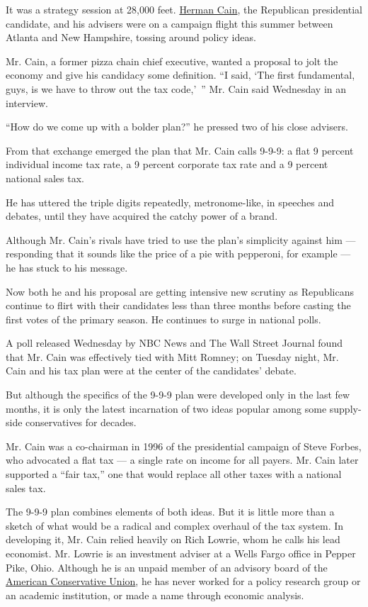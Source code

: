 It was a strategy session at 28,000 feet.
\href{http://elections.nytimes.com/2012/primaries/candidates/herman-cain}{Herman
Cain}, the Republican presidential candidate, and his advisers were on a
campaign flight this summer between Atlanta and New Hampshire, tossing
around policy ideas.

Mr. Cain, a former pizza chain chief executive, wanted a proposal to
jolt the economy and give his candidacy some definition. ``I said, `The
first fundamental, guys, is we have to throw out the tax code,'~'' Mr.
Cain said Wednesday in an interview.

``How do we come up with a bolder plan?'' he pressed two of his close
advisers.

From that exchange emerged the plan that Mr. Cain calls 9-9-9: a flat 9
percent individual income tax rate, a 9 percent corporate tax rate and a
9 percent national sales tax.

He has uttered the triple digits repeatedly, metronome-like, in speeches
and debates, until they have acquired the catchy power of a brand.

Although Mr. Cain's rivals have tried to use the plan's simplicity
against him --- responding that it sounds like the price of a pie with
pepperoni, for example --- he has stuck to his message.

Now both he and his proposal are getting intensive new scrutiny as
Republicans continue to flirt with their candidates less than three
months before casting the first votes of the primary season. He
continues to surge in national polls.

A poll released Wednesday by NBC News and The Wall Street Journal found
that Mr. Cain was effectively tied with Mitt Romney; on Tuesday night,
Mr. Cain and his tax plan were at the center of the candidates' debate.

But although the specifics of the 9-9-9 plan were developed only in the
last few months, it is only the latest incarnation of two ideas popular
among some supply-side conservatives for decades.

Mr. Cain was a co-chairman in 1996 of the presidential campaign of Steve
Forbes, who advocated a flat tax --- a single rate on income for all
payers. Mr. Cain later supported a ``fair tax,'' one that would replace
all other taxes with a national sales tax.

The 9-9-9 plan combines elements of both ideas. But it is little more
than a sketch of what would be a radical and complex overhaul of the tax
system. In developing it, Mr. Cain relied heavily on Rich Lowrie, whom
he calls his lead economist. Mr. Lowrie is an investment adviser at a
Wells Fargo office in Pepper Pike, Ohio. Although he is an unpaid member
of an advisory board of the \href{http://www.conservative.org/}{American
Conservative Union}, he has never worked for a policy research group or
an academic institution, or made a name through economic analysis.

